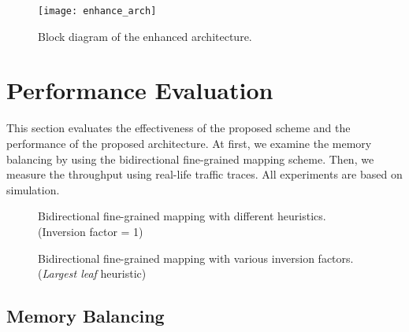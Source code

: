 \documentclass{sigcomm-alternate}
\begin{document}
\begin{figure}[thb]
\centering
\texttt{[image: enhance\_arch]}
\caption{Block diagram of the enhanced architecture.}
\label{fig:enhance_arch}
\end{figure}


\section{Performance Evaluation}
\label{sec:performance}

This section evaluates the effectiveness of the proposed scheme and the performance of the proposed architecture. At first, we examine the memory balancing by using the bidirectional fine-grained mapping scheme. Then, we measure the throughput using real-life traffic traces. All experiments are based on simulation.

\begin{figure*}[htb]
\centering
{}
\hfil
{}
\vfil
{}
\hfil
{}
\caption{Bidirectional fine-grained mapping with different heuristics. (Inversion factor = 1)}
\label{fig:biolp_heuristic}
\end{figure*}

\begin{figure*}[htb]
\centering
{}
\hfil
{}
\vfil
{}
\hfil
{}
\caption{Bidirectional fine-grained mapping with various inversion factors. (\textit{Largest leaf} heuristic)}
\label{fig:biolp_ifr}
\end{figure*}


\subsection{Memory Balancing}
\end{document}
